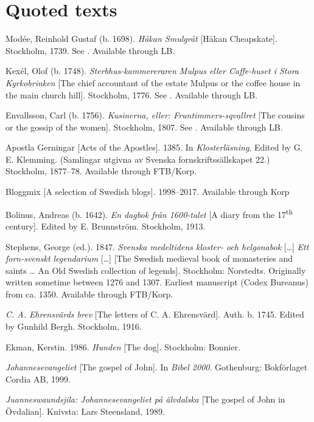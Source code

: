 \documentclass[output=paper]{langscibook}
\begin{document}
\section*{Quoted texts}
\begin{description}[font=\normalfont]\sloppy
\item[1dSMUL:] Modée, Reinhold Gustaf (b. 1698). \textit{Håkan Smulgråt} [Håkan Cheapskate]. Stockholm, 1739. See  \citet{MarttalaStromquist2001}. Available through LB.
\item[2aSTERBH:] Kexél, Olof (b. 1748). \textit{Sterbhus-kammereraren Mulpus eller Caffe-huset i Stora Kyrkobrinken} [The chief accountant of the estate Mulpus or the coffee house in the main church hill]. Stockholm, 1776. See \citet{MarttalaStromquist2001}. Available through LB.
\item[2cKUSINE:] Envallsson, Carl (b. 1756). \textit{Kusinerna, eller: Fruntimmers-sqvallret} [The cousins or the gossip of the women]. Stockholm, 1807. See \citet{MarttalaStromquist2001}. Available through LB.
\item[ApG:] Apostla Gerningar [Acts of the Apostles]. 1385. In \textit{Klosterläsning}. Edited by G. E. Klemming. (Samlingar utgivna av Svenska fornskriftssällskapet 22.) Stockholm, 1877–78. Available through FTB/Korp.
\item[Blogg:] Bloggmix [A selection of Swedish blogs]. 1998–2017. Available through Korp
\item[Bol:] Bolinus, Andreas (b. 1642). \textit{En dagbok från 1600-talet} [A diary from the 17\textsuperscript{th} century]. Edited by E. Brunnström. Stockholm, 1913. 
\item[Leg:] Stephens, George (ed.). 1847. \textit{Svenska medeltidens kloster- och helgonabok} […] \textit{Ett forn-svenskt legendarium} […] [The Swedish medieval book of monasteries and saints … An Old Swedish collection of legends]. Stockholm: Norstedts. Originally written sometime between 1276 and 1307. Earliest manuscript (Codex Bureanus) from ca. 1350. Available through FTB/Korp.
\item[Ehrensvärd:] \textit{C. A. Ehrensvärds brev} [The letters of C. A. Ehrensvärd]. Auth. b. 1745. Edited by Gunhild Bergh. Stockholm, 1916.
\item[Hunden:] Ekman, Kerstin. 1986. \textit{Hunden} [The dog]. Stockholm: Bonnier. 
\item[Joh.:] \textit{Johannesevangeliet} [The gospel of John]. In \textit{Bibel 2000}. Gothenburg: Bokförlaget Cordia AB, 1999. 
\item[Jua.:] \textit{Juanneswaundsjila: Johannesevangeliet på älvdalska} [The gospel of John in Övdalian]. Knivsta: Lars Steensland, 1989.

\end{description}
\end{document}
